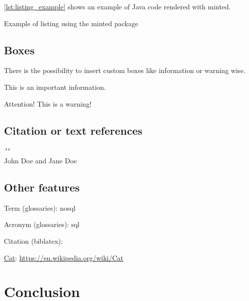 \autoref{lst:listing_example} shows an example of Java code rendered with minted.

\begin{listing}[H]
    \caption{Example of listing using the minted package}
    \label{lst:listing_example}
\end{listing}

\subsection{Boxes}

There is the possibility to insert custom boxes like  information or warning wise.

\begin{info}
    This is an important information.
\end{info}

\begin{warning}
    Attention! This is a warning!
\end{warning}

\subsection{Citation or text references}
\begin{tcolorbox}[
    colback=white,
    colframe=languidlavender,
    sharp corners,
    title={\textit{Citation}},
    fonttitle=\bfseries\color{black}
]
\textit{"\lipsum[1][1]"} \\[1ex]
\hfill John Doe and Jane Doe
\end{tcolorbox}

\subsection{Other features}

Term (glossaries): \gls{nosql}

Acronym (glossaries): \gls{sql}

Citation (biblatex): \cite{paper_millwheel}

\href{https://en.wikipedia.org/wiki/Cat}{Cat}: 
\url{https://en.wikipedia.org/wiki/Cat}


\section{Conclusion}

\blindtext

